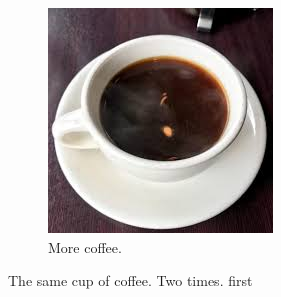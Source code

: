 \documentclass{article}
\begin{document}
\begin{figure}[h!]
\begin{subfigure}[b]{0.4\linewidth}
    \includegraphics[width=\linewidth]{coffee.jpg}
    \caption{More coffee.}
  \end{subfigure}
  \caption{The same cup of coffee. Two times. first} 
  \label{fig:coffee1}


\end{figure}
\end{document}
